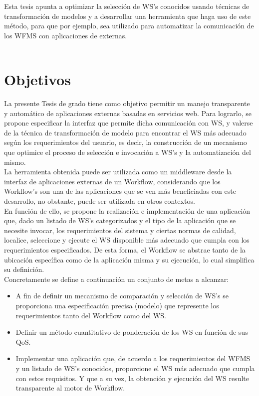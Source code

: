 Esta tesis apunta a optimizar la selección de WS's conocidos usando técnicas de transformación de modelos y a desarrollar una herramienta que haga uso de este método, para que por ejemplo, sea utilizado para automatizar la comunicación de los WFMS con aplicaciones de externas.\\\\


\section{Objetivos}
\label{Objetivos}

La presente Tesis de grado tiene como objetivo permitir un manejo transparente y automático de aplicaciones externas basadas en servicios web. Para lograrlo, se propone especificar la interfaz que permite dicha comunicación con WS, y valerse de la técnica de transformación de modelo para encontrar el WS más adecuado según los requerimientos del usuario, es decir, la construcción de un mecanismo que optimice el proceso de selección e invocación a WS’s y la automatización del mismo. \\

La herramienta obtenida puede ser utilizada como un middleware desde la interfaz  de aplicaciones externas de un Workflow, considerando que los Workflow's son una de las aplicaciones que se ven más beneficiadas con este desarrollo, no obstante, puede ser utilizada en otros contextos.\\

En función de ello, se propone la realización e implementación de una aplicación que, dado un listado de WS's categorizados y el tipo de la aplicación que se necesite invocar, los requerimientos del sistema y ciertas normas de calidad, localice, seleccione y ejecute el WS disponible  más adecuado que cumpla con los requerimientos especificados. De esta forma, el Workflow se abstrae tanto de la ubicación específica como de la aplicación misma y su ejecución, lo cual simplifica su definición.\\

Concretamente se define a continuación un conjunto de metas a alcanzar:
\begin{itemize}
	\item A fin de definir un mecanismo de comparación y selección de WS's se proporciona una especificación precisa (modelo) que represente los requerimientos tanto del Workflow como del WS.
	
	\item Definir un método cuantitativo de ponderación de los WS en función de sus QoS.
	
	\item Implementar una aplicación que, de acuerdo a los requerimientos del WFMS y un listado de WS's conocidos, proporcione el WS más adecuado que cumpla con estos requisitos. Y que a su vez, la obtención y ejecución del WS resulte transparente al motor de Workflow.
	
\end{itemize}

